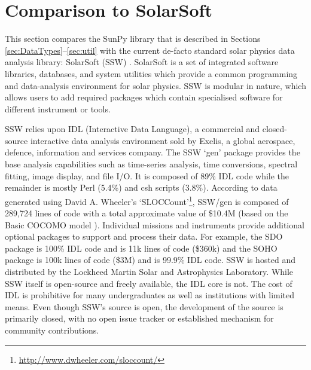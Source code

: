 \section{Comparison to SolarSoft}\label{sec:ssw}
This section compares the SunPy library that is described in Sections 
\ref{sec:DataTypes}--\ref{sec:util} with the current de-facto standard solar 
physics data analysis library: SolarSoft (SSW) \citep{freeland1998}.
SolarSoft is a set of integrated software libraries, databases, and system 
utilities which provide a common programming and data-analysis environment for 
solar physics. SSW is modular in nature, which allows users to add required 
packages which contain specialised software for different instrument or tools.


SSW relies upon IDL (Interactive Data 
Language), a commercial and closed-source interactive data analysis environment 
sold by Exelis, a global aerospace, defence, information and services company. 
The SSW `gen' package provides the base analysis capabilities such as time-series
analysis, time conversions, spectral fitting, image display, and file 
I/O. It is composed of 89\% IDL code while the remainder is mostly Perl (5.4\%) 
and csh scripts (3.8\%). 
According to data generated using David A. Wheeler's `SLOCCount'\footnote{\url{http://www.dwheeler.com/sloccount/}}, SSW/gen is composed of 
289,724 lines of code with a total approximate value of \$10.4M (based on the 
Basic COCOMO model \citep{_cocomo_2014}). 
Individual missions and instruments provide additional optional packages to 
support and process their data. For example, the SDO package \citep{sdo} is 
100\% IDL code and is 11k lines of code (\$360k) and the SOHO package 
\citep{soho} is 100k lines of code (\$3M) and is 99.9\% IDL code. SSW is hosted 
and distributed by the Lockheed Martin Solar and Astrophysics Laboratory.
While SSW itself is open-source and freely available, the IDL core is not. The cost 
of IDL is prohibitive for many undergraduates as well as institutions 
with limited means.
Even though SSW's source is open, the development of the source is primarily closed,
with no open issue tracker or established mechanism for community contributions.

